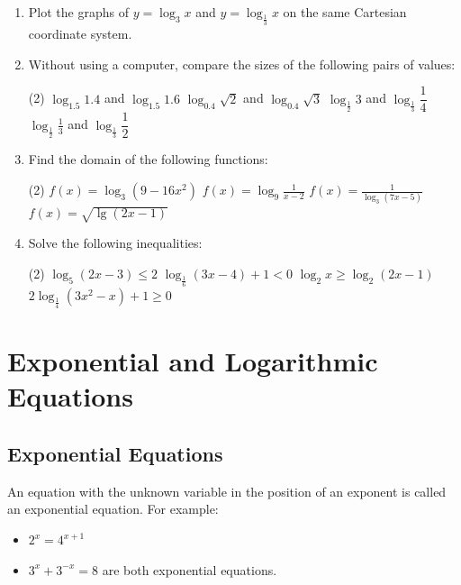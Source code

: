 \documentclass{report}
\begin{document}
			\begin{enumerate}
				\item Plot the graphs of $y=\log _3 x$ and $y=\log _{\frac{1}{3}} x$ on the same Cartesian coordinate system.
				\item Without using a computer, compare the sizes of the following pairs of values:
				      \begin{tasks}[label=(\alph*)](2)
				      	\task $\displaystyle\log _{1.5} 1.4$ and $\log _{1.5} 1.6$
				      	\task $\displaystyle\log _{0.4} \sqrt{2}$ and $\log _{0.4} \sqrt{3}$
				      	\task $\displaystyle\log _{\frac{1}{2}} 3$ and $\log _{\frac{1}{3}} \dfrac{1}{4}$
				      	\task $\displaystyle\log _{\frac{1}{2}} \frac{1}{3}$ and $\log _{\frac{1}{3}} \dfrac{1}{2}$
				      \end{tasks}
				\item Find the domain of the following functions:
				      \begin{tasks}[label=(\alph*)](2)
				      	\task $\displaystyle f(x)=\log _3\left(9-16 x^2\right)$
				      	\task $\displaystyle f(x)=\log _9 \frac{1}{x-2}$
				      	\task $\displaystyle f(x)=\frac{1}{\log _3(7 x-5)}$
				      	\task $\displaystyle f(x)=\sqrt{\lg (2 x-1)}$
				      \end{tasks}
				\item Solve the following inequalities:
				      \begin{tasks}[label=(\alph*)](2)
				      	\task $\log _5(2 x-3) \leq 2$
				      	\task $\log _{\frac{1}{6}}(3 x-4)+1<0$
				      	\task $\log _2 x \geq \log _2(2 x-1)$
				      	\task $2 \log _{\frac{1}{4}}\left(3 x^2-x\right)+1 \geq 0$
				      \end{tasks}
			\end{enumerate}
			
			\newpage
			\section{Exponential and Logarithmic Equations}
			
			\subsection*{Exponential Equations}
			
			An equation with the unknown variable in the position of an exponent is called an exponential equation. For example:
			\vspace{-2em}
			\begin{itemize}
				\item $2^x=4^{x+1}$
				\item $3^x+3^{-x}=8$ are both exponential equations.
			\end{itemize}
			
\end{document}

